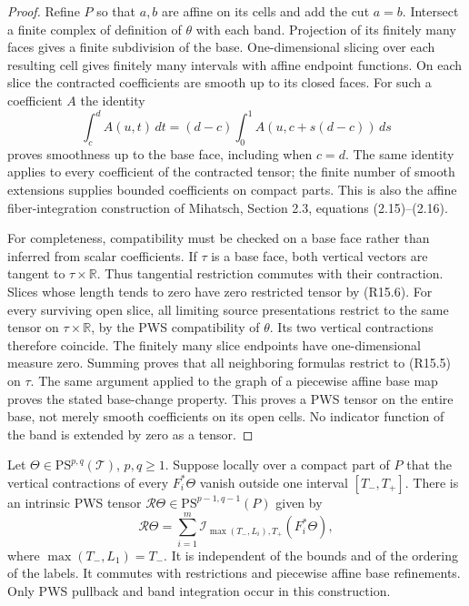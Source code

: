 \begin{proof}
Refine $P$ so that $a,b$ are affine on its cells and add the cut $a=b$.
Intersect a finite complex of definition of $\theta$ with each band.
Projection of its finitely many faces gives a finite subdivision of the
base.  One-dimensional slicing over each resulting cell gives finitely
many intervals with affine endpoint functions.  On each slice the
contracted coefficients are smooth up to its closed faces.  For such a
coefficient $A$ the identity
\[
 \int_c^d A(u,t)\,dt
  =(d-c)\int_0^1 A(u,c+s(d-c))\,ds             \tag{R15.6}
\]
proves smoothness up to the base face, including when $c=d$.  The same
identity applies to every coefficient of the contracted tensor; the
finite number of smooth extensions supplies bounded coefficients on
compact parts.  This is also the affine fiber-integration construction
of Mihatsch, Section 2.3, equations (2.15)--(2.16).

For completeness, compatibility must be checked on a base face rather
than inferred from scalar coefficients.  If $\tau$ is a base face, both
vertical vectors are tangent to $\tau\times\mathbb R$.  Thus tangential
restriction commutes with their contraction.  Slices whose length tends
to zero have zero restricted tensor by (R15.6).  For every surviving
open slice, all limiting source presentations restrict to the same
tensor on $\tau\times\mathbb R$, by the PWS compatibility of $\theta$.
Its two vertical contractions therefore coincide.  The finitely many
slice endpoints have one-dimensional measure zero.  Summing proves
that all neighboring formulas restrict to (R15.5) on $\tau$.
The same argument applied to the graph of a piecewise affine base map
proves the stated base-change property.  This proves a PWS tensor on
the entire base, not merely smooth coefficients on its open cells.
No indicator function of the band is extended by zero as a tensor.
\end{proof}

\begin{proposition}
\label{r15ray:polyhedral}
Let $\Theta\in\mathrm{PS}^{p,q}(\mathcal T)$, $p,q\geq1$.
Suppose locally over a compact part of $P$ that the vertical contractions
of every $F_i^*\Theta$ vanish outside one interval $[T_-,T_+]$.
There is an intrinsic PWS tensor
$\mathcal R\Theta\in\mathrm{PS}^{p-1,q-1}(P)$ given by
\[
 \mathcal R\Theta
 =\sum_{i=1}^m
     \mathcal I_{\max(T_-,L_i),T_+}(F_i^*\Theta),          \tag{R15.7}
\]
where $\max(T_-,L_1)=T_-$.  It is independent of the bounds and of
the ordering of the labels.  It commutes with restrictions and
piecewise affine base refinements.  Only PWS pullback and band
integration occur in this construction.
\end{proposition}

